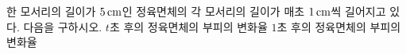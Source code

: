 한 모서리의 길이가 $5\mkern3mu \mathrm{cm}$인 정육면체의 각 모서리의 길이가 매초 $1\mkern3mu \mathrm{cm}$씩 길어지고 있다. 다음을 구하시오.
 $t$초 후의 정육면체의 부피의 변화율
 $1$초 후의 정육면체의 부피의 변화율
